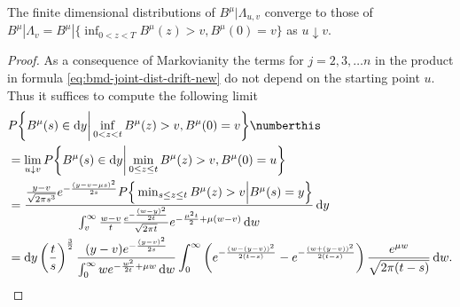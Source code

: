 %
%
\begin{lemma}\label{lem:fin-dim}
	The finite dimensional distributions of $ B^\mu | \Lambda_{u,v} $ converge 
	to those of $ B^\mu | \Lambda_{v} = B^\mu| \{\inf_{ 0 < z < T } B^\mu(z) > v, B^\mu(0) = v \} $
	as $ u \downarrow v $. 
\end{lemma}
\begin{proof}
	As a consequence of Markovianity the terms for $ j=2, 3, \ldots n $ in the product in formula \eqref{eq:bmd-joint-dist-drift-new} do not depend on the 
	starting point $ u $. Thus it suffices to  compute the following limit
	\begin{align*}
		&
		P \bigg\{  
		B^\mu ( s) \in \mathrm d y \bigg |  \inf_{ 0 < z < t } B^\mu( z)  > v, B^\mu(0) = v  
		\bigg \} 
		\numberthis \label{eq:bmd-drift-dist-prooved}
		\\
		&=
		\lim_{ u \downarrow v} 
		P \bigg\{  
		B^\mu ( s) \in \mathrm d y \bigg |  \min_{ 0 \leq z \leq t } B^\mu( z)  > v, B^\mu(0) = u  
		\bigg \} 
		\\
		&=
		\frac{
			\frac{y - v}{\sqrt{2 \pi s^3} } e ^ {  -  \frac{(y - v - \mu s)^2}{2s} }
			P \Big\{  \min_{ s \leq z \leq t} B^\mu(z) > v \Big | B^\mu(s) = y  \Big\}      	
		}{
			\int_v^\infty \frac{w - v}{t}
			\frac{
			e^{  - \frac{ (w-y)^2}{2t} }	
		}{\sqrt{2 \pi t}}
		e^{  - \frac{\mu^2 t}{2} + \mu(w -v)  } 
		\, \mathrm d w
 		}
 	\,\mathrm d y
 	\\
	&=
\mathrm d y \left(\frac ts \right)^{\frac 32} 
\frac{
	(y - v) e^{  -\frac{(y-v)^2}{2s}  }
}{
	\int_0^{\infty} w  e^{  - \frac { w^2 } { 2t } + \mu w } \,\mathrm d w 
}
\int_0^\infty  \left( e^{ - \frac{(w-(y-v) )^2}{2 ( t-s)}}  - e^{ - \frac{(w + (y - v ) )^2}{2 ( t-s)}}  \right)
\frac{e^{\mu w }}{\sqrt{2 \pi( t-s)}} \, \mathrm d w  .
	\end{align*}



\end{proof}
